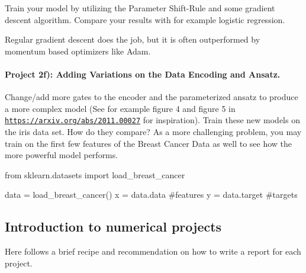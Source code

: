 \documentclass[%
oneside,                 %
final,                   %
10pt]{article}
\begin{document}
Train your model by utilizing the Parameter Shift-Rule and some
gradient descent algorithm. Compare your results with for example
logistic regression.

Regular gradient descent does the job, but it is often outperformed by momentum based optimizers like Adam.


\paragraph{Project 2f): Adding Variations on the Data Encoding and Ansatz.}
Change/add more gates to the encoder and the parameterized ansatz to produce a more complex model (See for example figure 4 and figure 5 in \href{{https://arxiv.org/abs/2011.00027}}{\nolinkurl{https://arxiv.org/abs/2011.00027}} for inspiration). Train these new models on the iris data set. How do they compare? As a more challenging problem, you may train on the first few features of the Breast Cancer Data as well to see how the more powerful model performs.

\bpycod
from sklearn.datasets import load_breast_cancer

data = load_breast_cancer()
x = data.data #features
y = data.target #targets
\epycod





\subsection{Introduction to numerical projects}

Here follows a brief recipe and recommendation on how to write a report for each
project.
\end{document}
